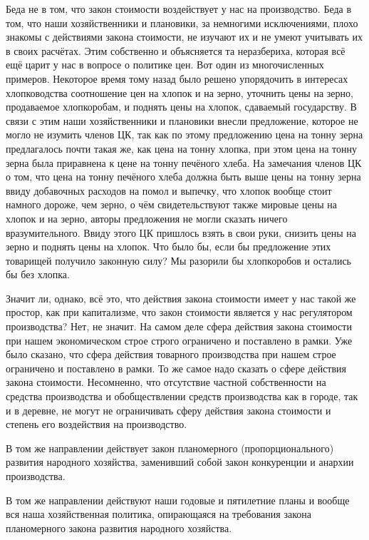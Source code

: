 \documentclass[12pt, a4paper, openany]{book}
\begin{document}
Беда не в том, что закон стоимости воздействует у нас на производство. Беда в том, что наши хозяйственники и плановики, за немногими исключениями, плохо знакомы с действиями закона стоимости, не изучают их и не умеют учитывать их в своих расчётах. Этим собственно и объясняется та неразбериха, которая всё ещё царит у нас в вопросе о политике цен. Вот один из многочисленных примеров. Некоторое время тому назад было решено упорядочить в интересах хлопководства соотношение цен на хлопок и на зерно, уточнить цены на зерно, продаваемое хлопкоробам, и поднять цены на хлопок, сдаваемый государству. В связи с этим наши хозяйственники и плановики внесли предложение, которое не могло не изумить членов ЦК, так как по этому предложению цена на тонну зерна предлагалось почти такая же, как цена на тонну хлопка, при этом цена на тонну зерна была приравнена к цене на тонну печёного хлеба. На замечания членов ЦК о том, что цена на тонну печёного хлеба должна быть выше цены на тонну зерна ввиду добавочных расходов на помол и выпечку, что хлопок вообще стоит намного дороже, чем зерно, о чём свидетельствуют также мировые цены на хлопок и на зерно, авторы предложения не могли сказать ничего вразумительного. Ввиду этого ЦК пришлось взять в свои руки, снизить цены на зерно и поднять цены на хлопок. Что было бы, если бы предложение этих товарищей получило законную силу? Мы разорили бы хлопкоробов и остались бы без хлопка.



Значит ли, однако, всё это, что действия закона стоимости имеет у нас такой же простор, как при капитализме, что закон стоимости является у нас регулятором производства? Нет, не значит. На самом деле сфера действия закона стоимости при нашем экономическом строе строго ограничено и поставлено в рамки. Уже было сказано, что сфера действия товарного производства при нашем строе ограничено и поставлено в рамки. То же самое надо сказать о сфере действия закона стоимости. Несомненно, что отсутствие частной собственности на средства производства и обобществлении средств производства как в городе, так и в деревне, не могут не ограничивать сферу действия закона стоимости и степень его воздействия на производство.



В том же направлении действует закон планомерного (пропорционального) развития народного хозяйства, заменивший собой закон конкуренции и анархии производства.



В том же направлении действуют наши годовые и пятилетние планы и вообще вся наша хозяйственная политика, опирающаяся на требования закона планомерного закона развития народного хозяйства.
\end{document}
